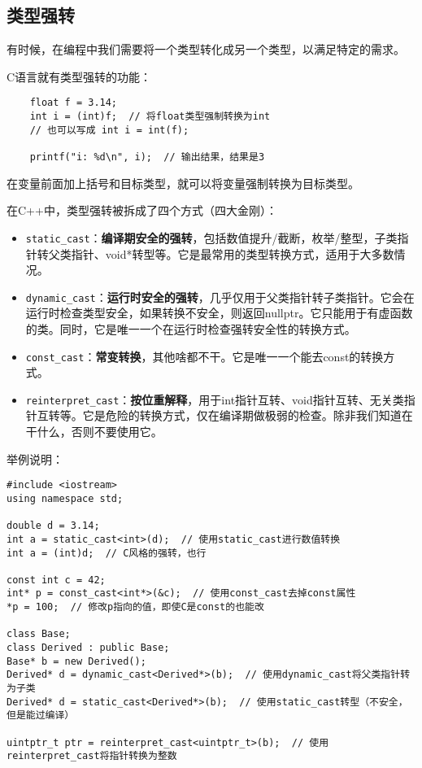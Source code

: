 \documentclass[../main.tex]{subfiles}
\begin{document}
\subsection{类型强转}

有时候，在编程中我们需要将一个类型转化成另一个类型，以满足特定的需求。

C语言就有类型强转的功能：
\begin{lstlisting}
    float f = 3.14;
    int i = (int)f;  // 将float类型强制转换为int
    // 也可以写成 int i = int(f);

    printf("i: %d\n", i);  // 输出结果，结果是3
\end{lstlisting}
在变量前面加上括号和目标类型，就可以将变量强制转换为目标类型。

在C++中，类型强转被拆成了四个方式（四大金刚）：
\begin{itemize}
  \item \texttt{static\_cast}：\textbf{编译期安全的强转}，包括数值提升/截断，枚举/整型，子类指针转父类指针、void*转型等。它是最常用的类型转换方式，适用于大多数情况。
  \item \texttt{dynamic\_cast}：\textbf{运行时安全的强转}，几乎仅用于父类指针转子类指针。它会在运行时检查类型安全，如果转换不安全，则返回nullptr。它只能用于有虚函数的类。同时，它是唯一一个在运行时检查强转安全性的转换方式。
  \item \texttt{const\_cast}：\textbf{常变转换}，其他啥都不干。它是唯一一个能去const的转换方式。
  \item \texttt{reinterpret\_cast}：\textbf{按位重解释}，用于int指针互转、void指针互转、无关类指针互转等。它是危险的转换方式，仅在编译期做极弱的检查。除非我们知道在干什么，否则不要使用它。
\end{itemize}

举例说明：
\begin{lstlisting}
#include <iostream>
using namespace std;

double d = 3.14;
int a = static_cast<int>(d);  // 使用static_cast进行数值转换
int a = (int)d;  // C风格的强转，也行

const int c = 42;
int* p = const_cast<int*>(&c);  // 使用const_cast去掉const属性
*p = 100;  // 修改p指向的值，即使C是const的也能改

class Base;
class Derived : public Base;
Base* b = new Derived();
Derived* d = dynamic_cast<Derived*>(b);  // 使用dynamic_cast将父类指针转为子类
Derived* d = static_cast<Derived*>(b);  // 使用static_cast转型（不安全，但是能过编译）

uintptr_t ptr = reinterpret_cast<uintptr_t>(b);  // 使用reinterpret_cast将指针转换为整数
\end{lstlisting}
\end{document}
